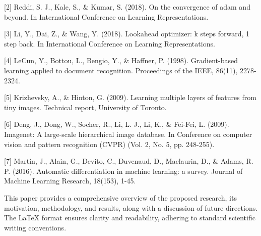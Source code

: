 [2] Reddi, S. J., Kale, S., & Kumar, S. (2018). On the convergence of adam and beyond. In International Conference on Learning Representations.

[3] Li, Y., Dai, Z., & Wang, Y. (2018). Lookahead optimizer: k steps forward, 1 step back. In International Conference on Learning Representations.

[4] LeCun, Y., Bottou, L., Bengio, Y., & Haffner, P. (1998). Gradient-based learning applied to document recognition. Proceedings of the IEEE, 86(11), 2278-2324.

[5] Krizhevsky, A., & Hinton, G. (2009). Learning multiple layers of features from tiny images. Technical report, University of Toronto.

[6] Deng, J., Dong, W., Socher, R., Li, L. J., Li, K., & Fei-Fei, L. (2009). Imagenet: A large-scale hierarchical image database. In Conference on computer vision and pattern recognition (CVPR) (Vol. 2, No. 5, pp. 248-255).

[7] Martín, J., Alain, G., Devito, C., Duvenaud, D., Maclaurin, D., & Adams, R. P. (2016). Automatic differentiation in machine learning: a survey. Journal of Machine Learning Research, 18(153), 1-45. 

This paper provides a comprehensive overview of the proposed research, its motivation, methodology, and results, along with a discussion of future directions. The LaTeX format ensures clarity and readability, adhering to standard scientific writing conventions.